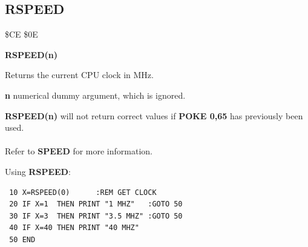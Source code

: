 \subsection{RSPEED}
\begin{description}[leftmargin=2cm,style=nextline]
\item [Token:] \$CE \$0E
\item [Format:] {\bf RSPEED(n)}
\item [Usage:]  Returns the current CPU clock in MHz.

                {\bf n} numerical dummy argument, which is ignored.

\item [Remarks:] {\bf RSPEED(n)} will not return correct values
                 if {\bf POKE 0,65} has previously been used.
                 \\
                 \\
                 Refer to {\bf SPEED} for more information.

\item [Example:] Using {\bf RSPEED}:
\begin{tcolorbox}[colback=black,coltext=white]
\verbatimfont{\codefont}
\begin{verbatim}
 10 X=RSPEED(0)      :REM GET CLOCK
 20 IF X=1  THEN PRINT "1 MHZ"   :GOTO 50
 30 IF X=3  THEN PRINT "3.5 MHZ" :GOTO 50
 40 IF X=40 THEN PRINT "40 MHZ"
 50 END
\end{verbatim}
\end{tcolorbox}
\end{description}


\newpage
